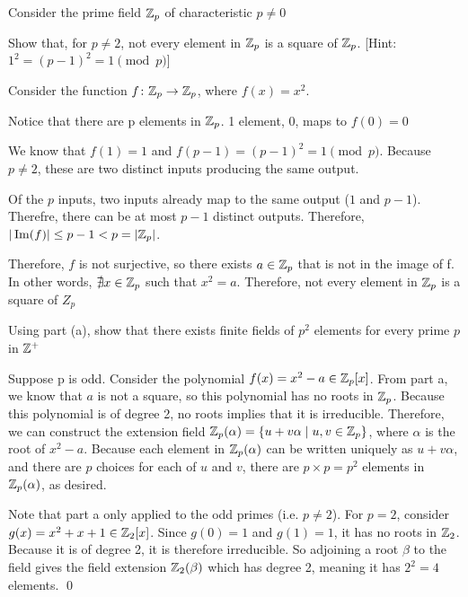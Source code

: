 \documentclass{article}
\begin{document}
\begin{problem}[29.32]
    Consider the prime field $\mathbb{Z}_p$ of characteristic $p \neq 0$
    \begin{subproblem}
        \item Show that, for $p \neq 2$, not every element in $\mathbb{Z}_p$ is a square of $\mathbb{Z}_p$. [Hint: $1^2 = (p-1)^2 = 1 \pmod{p}$]
    \end{subproblem}
    \begin{solution}
        Consider the function $f\colon \mathbb{Z}_p \to \mathbb{Z}_p$, where $f(x) = x^2$. 
        
        Notice that there are p elements in $\mathbb{Z}_p$. 1 element, 0, maps to $f(0) = 0$

        We know that $f(1) = 1$ and $f(p-1) = (p-1)^2 = 1 \pmod{p}$. Because $p \neq 2$, these are two distinct inputs producing the same output. 

        Of the $p$ inputs, two inputs already map to the same output ($1$ and $p-1$). Therefre, there can be at most $p-1$ distinct outputs. Therefore, $|\operatorname{Im}(f)| \leq p-1 < p = |\mathbb{Z}_p|$. 

        Therefore, $f$ is not surjective, so there exists $a \in \mathbb{Z}_p $ that is not in the image of f. In other words, $\nexists x \in \mathbb{Z}_p$ such that $x^2 = a$. Therefore, not every element in $\mathbb{Z}_p$ is a square of $Z_p$
    \end{solution}
    \begin{subproblem}[resume]
        \item Using part (a), show that there exists finite fields of $p^2$ elements for every prime $p$ in $\mathbb{Z}^+$
    \end{subproblem}
    \begin{solution}
        Suppose p is odd. Consider the polynomial $f(x) = x^2 - a \in \mathbb{Z}_p[x]$. From part a, we know that $a$ is not a square, so this polynomial has no roots in $\mathbb{Z}_p$. Because this polynomial is of degree 2, no roots implies that it is irreducible. Therefore, we can construct the extension field $\mathbb{Z}_p(\alpha) = \{u+v\alpha \mid u, v \in \mathbb{Z}_p\}$, where $\alpha$ is the root of $x^2 - a$. Because each element in $\mathbb{Z}_p(\alpha)$ can be written uniquely as $u+v\alpha$, and there are $p$ choices for each of $u$ and $v$, there are $p \times p = p^2$ elements in $\mathbb{Z}_p(\alpha)$, as desired. 
        
        Note that part a only applied to the odd primes (i.e. $p \neq 2$). For $p=2$, consider $g(x) = x^2 + x + 1 \in \mathbb{Z}_2[x]$. Since $g(0) = 1$ and $g(1) = 1$, it has no roots in $\mathbb{Z}_2$. Because it is of degree 2, it is therefore irreducible. So adjoining a root $\beta$ to the field gives the field extension $\mathbb{Z}_2(\beta)$ which has degree 2, meaning it has $2^2 = 4$ elements. \qed
    \end{solution}
\end{problem}
\end{document}
